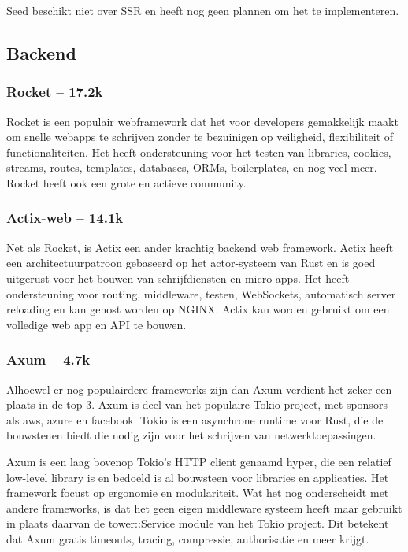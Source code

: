 Seed beschikt niet over SSR en heeft nog geen plannen om het te implementeren. 

\subsection{Backend}

\subsubsection{Rocket – 17.2k}

Rocket is een populair webframework dat het voor developers gemakkelijk maakt om snelle webapps te
schrijven zonder te bezuinigen op veiligheid, flexibiliteit of functionaliteiten. Het heeft
ondersteuning voor het testen van libraries, cookies, streams, routes, templates, databases, ORMs,
boilerplates, en nog veel meer. Rocket heeft ook een grote en actieve community. 

\subsubsection{Actix-web – 14.1k}

Net als Rocket, is Actix een ander krachtig backend web framework. Actix heeft een
architectuurpatroon gebaseerd op het actor-systeem van Rust en is goed uitgerust voor het bouwen van
schrijfdiensten en micro apps. Het heeft ondersteuning voor routing, middleware, testen, WebSockets,
automatisch server reloading en kan gehost worden op NGINX. Actix kan worden gebruikt om een
volledige web app en API te bouwen. 

\clearpage

\subsubsection{Axum – 4.7k}

Alhoewel er nog populairdere frameworks zijn dan Axum verdient het zeker een plaats in de top 3.
Axum is deel van het populaire Tokio project, met sponsors als aws, azure en facebook. Tokio is een
asynchrone runtime voor Rust, die de bouwstenen biedt die nodig zijn voor het schrijven van
netwerktoepassingen. 

Axum is een laag bovenop Tokio’s HTTP client genaamd hyper, die een relatief low-level library is en
bedoeld is al bouwsteen voor libraries en applicaties. Het framework focust op ergonomie en
modulariteit. Wat het nog onderscheidt met andere frameworks, is dat het geen eigen middleware
systeem heeft maar gebruikt in plaats daarvan de tower::Service module van het Tokio project. Dit
betekent dat Axum gratis timeouts, tracing, compressie, authorisatie en meer krijgt. 

